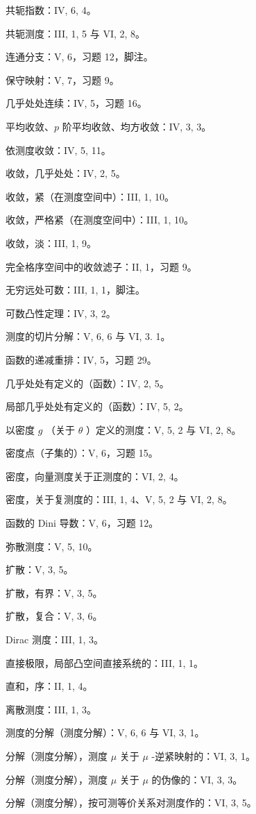 共轭指数：IV, 6, 4。

共轭测度：III, 1, 5 与 VI, 2, 8。

连通分支：V, 6，习题 12，脚注。

保守映射：V, 7，习题 9。

几乎处处连续：IV, 5，习题 16。

平均收敛、\(p\) 阶平均收敛、均方收敛：IV, 3, 3。

依测度收敛：IV, 5, 11。

收敛，几乎处处：IV, 2, 5。

收敛，紧（在测度空间中）：III, 1, 10。

收敛，严格紧（在测度空间中）：III, 1, 10。

收敛，淡：III, 1, 9。

完全格序空间中的收敛滤子：II, 1，习题 9。

无穷远处可数：III, 1, 1，脚注。

可数凸性定理：IV, 3, 2。

测度的切片分解：V, 6, 6 与 VI, 3. 1。

函数的递减重排：IV, 5，习题 29。

几乎处处有定义的（函数）：IV, 2, 5。

局部几乎处处有定义的（函数）：IV, 5, 2。

以密度 \(g\) （关于 \(\theta\) ）定义的测度：V, 5, 2 与 VI, 2, 8。

密度点（子集的）：V, 6，习题 15。

密度，向量测度关于正测度的：VI, 2, 4。

密度，关于复测度的：III, 1, 4、V, 5, 2 与 VI, 2, 8。

函数的 Dini 导数：V, 6，习题 12。

弥散测度：V, 5, 10。

扩散：V, 3, 5。

扩散，有界：V, 3, 5。

扩散，复合：V, 3, 6。

Dirac 测度：III, 1, 3。

直接极限，局部凸空间直接系统的：III, 1, 1。

直和，序：II, 1, 4。

离散测度：III, 1, 3。

测度的分解（测度分解）：V, 6, 6 与 VI, 3, 1。

分解（测度分解），测度 \(\mu\) 关于 \(\mu\) -逆紧映射的：VI, 3, 1。

分解（测度分解），测度 \(\mu\) 关于 \(\mu\) 的伪像的：VI, 3, 3。

分解（测度分解），按可测等价关系对测度作的：VI, 3, 5。

